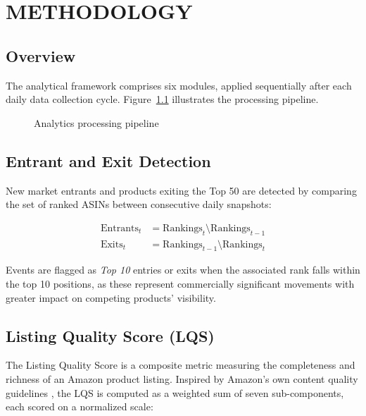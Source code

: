 \chapter{METHODOLOGY}

\section{Overview}

The analytical framework comprises six modules, applied sequentially after each daily
data collection cycle. Figure~\ref{fig:pipeline} illustrates the processing pipeline.

\begin{figure}[H]
  \centering
  \caption{Analytics processing pipeline}
  \label{fig:pipeline}
\end{figure}

\section{Entrant and Exit Detection}

New market entrants and products exiting the Top 50 are detected by comparing the
set of ranked ASINs between consecutive daily snapshots:

\begin{align}
  \text{Entrants}_t &= \text{Rankings}_t \setminus \text{Rankings}_{t-1} \\
  \text{Exits}_t    &= \text{Rankings}_{t-1} \setminus \text{Rankings}_t
\end{align}

Events are flagged as \textit{Top 10} entries or exits when the associated rank
falls within the top 10 positions, as these represent commercially significant
movements with greater impact on competing products' visibility.

\section{Listing Quality Score (LQS)}

The Listing Quality Score is a composite metric measuring the completeness and
richness of an Amazon product listing. Inspired by Amazon's own content quality
guidelines \cite{amazon2024listing}, the LQS is computed as a weighted sum of
seven sub-components, each scored on a normalized scale:

